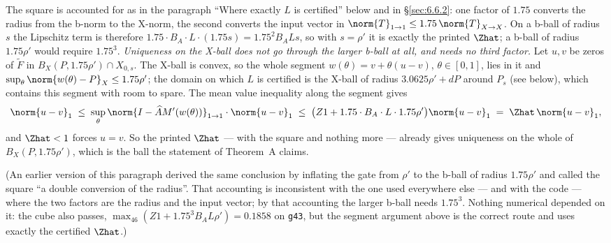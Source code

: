The square is accounted for as in the paragraph ``Where exactly $L$ is certified''
below and in \S\ref{sec:6.6.2}: one factor of $1.75$ converts the radius from the
b-norm to the X-norm, the second converts the input vector in
$\norm{T}_{1\to1}\le1.75\,\norm{T}_{X\to X}$. On a b-ball of radius $s$ the Lipschitz
term is therefore $1.75\cdot B_A\cdot L\cdot(1.75 s) = 1.75^{2}B_A L s$, so with
$s=\rho'$ it is exactly the printed $\Zhat$; a b-ball of radius $1.75\rho'$ would
require $1.75^{3}$. \emph{Uniqueness on the X-ball does not go through the larger
b-ball at all, and needs no third factor.} Let $u,v$ be zeros of
$\widetilde{F}$ in $B_X(P,1.75\rho')\cap X_{0,s}$. The X-ball is convex, so the whole
segment $w(\theta)=v+\theta(u-v)$, $\theta\in[0,1]$, lies in it and
$\sup_\theta\norm{w(\theta)-P}_X\le1.75\rho'$; the domain on which $L$ is certified
is the X-ball of radius $3.0625\rho'+dP$ around $P_s$ (see below), which contains
this segment with room to spare. The mean value inequality along the segment gives
\[
  \norm{u-v}_1 \;\le\; \sup_\theta\norm{I-\widehat{A}M'(w(\theta))}_{1\to1}\cdot\norm{u-v}_1
  \;\le\; \bigl(Z1 + 1.75\cdot B_A\cdot L\cdot 1.75\rho'\bigr)\norm{u-v}_1
  \;=\; \Zhat\,\norm{u-v}_1 ,
\]
and $\Zhat<1$ forces $u=v$. So the printed $\Zhat$ --- with the square and nothing
more --- already gives uniqueness on the whole of $B_X(P,1.75\rho')$, which is the
ball the statement of Theorem~A claims.

(An earlier version of this paragraph derived the same conclusion by inflating the
gate from $\rho'$ to the b-ball of radius $1.75\rho'$ and called the square ``a double
conversion of the radius''. That accounting is inconsistent with the one used
everywhere else --- and with the code --- where the two factors are the radius and
the input vector; by that accounting the larger b-ball needs $1.75^{3}$. Nothing
numerical depended on it: the cube also passes, $\max_{46}(Z1+1.75^{3}B_A L\rho')
= 0.1858$ on \texttt{g43}, but the segment argument above is the correct route and
uses exactly the certified $\Zhat$.)

